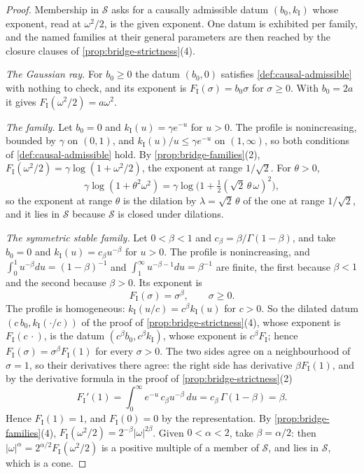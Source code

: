 \begin{proof}\leanok
Membership in $\mathcal{S}$ asks for a causally admissible datum $(b_0, k_{\mathrm I})$ whose
exponent, read at $\omega^2/2$, is the given exponent. One datum is exhibited per family, and the
named families at their general parameters are then reached by the closure clauses of
\ref{prop:bridge-strictness}(4).

\emph{The Gaussian ray.} For $b_0 \ge 0$ the datum $(b_0, 0)$ satisfies
\ref{def:causal-admissible} with nothing to check, and its exponent is
$F_{\mathrm I}(\sigma) = b_0\sigma$ for $\sigma \ge 0$. With $b_0 = 2a$ it gives
$F_{\mathrm I}(\omega^2/2) = a\omega^2$.

\emph{The \Matern{} family.} Let $b_0 = 0$ and $k_{\mathrm I}(u) = \gamma e^{-u}$ for $u > 0$. The
profile is nonincreasing, bounded by $\gamma$ on $(0,1)$, and $k_{\mathrm I}(u)/u \le \gamma
e^{-u}$ on $(1,\infty)$, so both conditions of \ref{def:causal-admissible} hold. By
\ref{prop:bridge-families}(2), $F_{\mathrm I}(\omega^2/2) = \gamma\log(1 + \omega^2/2)$, the
\Matern{} exponent at range $1/\sqrt2$. For $\theta > 0$,
\[
  \gamma\log(1 + \theta^2\omega^2) = \gamma\log\bigl(1 + \tfrac12(\sqrt2\,\theta\,\omega)^2\bigr),
\]
so the \Matern{} exponent at range $\theta$ is the dilation by $\lambda = \sqrt2\,\theta$ of the one
at range $1/\sqrt2$, and it lies in $\mathcal{S}$ because $\mathcal{S}$ is closed under
dilations.

\emph{The symmetric stable family.} Let $0 < \beta < 1$ and $c_\beta = \beta/\Gamma(1-\beta)$,
and take $b_0 = 0$ and $k_{\mathrm I}(u) = c_\beta u^{-\beta}$ for $u > 0$. The profile is
nonincreasing, and $\int_0^1 u^{-\beta}du = (1-\beta)^{-1}$ and
$\int_1^\infty u^{-\beta-1}du = \beta^{-1}$ are finite, the first because $\beta < 1$ and the
second because $\beta > 0$. Its exponent is
\[
  F_{\mathrm I}(\sigma) = \sigma^\beta, \qquad \sigma \ge 0 .
\]
The profile is homogeneous: $k_{\mathrm I}(u/c) = c^\beta k_{\mathrm I}(u)$ for $c > 0$. So the
dilated datum $(c\,b_0, k_{\mathrm I}(\cdot/c))$ of the proof of \ref{prop:bridge-strictness}(4),
whose exponent is $F_{\mathrm I}(c\,\cdot)$, is the datum $(c^\beta b_0, c^\beta k_{\mathrm I})$,
whose exponent is $c^\beta F_{\mathrm I}$; hence $F_{\mathrm I}(\sigma) = \sigma^\beta
F_{\mathrm I}(1)$ for every $\sigma > 0$. The two sides agree on a neighbourhood of $\sigma = 1$,
so their derivatives there agree: the right side has derivative $\beta F_{\mathrm I}(1)$, and by
the derivative formula in the proof of \ref{prop:bridge-strictness}(2)
\[
  F_{\mathrm I}'(1) = \int_0^\infty e^{-u}\,c_\beta u^{-\beta}\,du = c_\beta\,\Gamma(1-\beta)
  = \beta .
\]
Hence $F_{\mathrm I}(1) = 1$, and $F_{\mathrm I}(0) = 0$ by the representation. By
\ref{prop:bridge-families}(4), $F_{\mathrm I}(\omega^2/2) = 2^{-\beta}|\omega|^{2\beta}$. Given
$0 < \alpha < 2$, take $\beta = \alpha/2$: then $|\omega|^\alpha = 2^{\alpha/2}F_{\mathrm
I}(\omega^2/2)$ is a positive multiple of a member of $\mathcal{S}$, and lies in $\mathcal{S}$,
which is a cone.
\end{proof}

